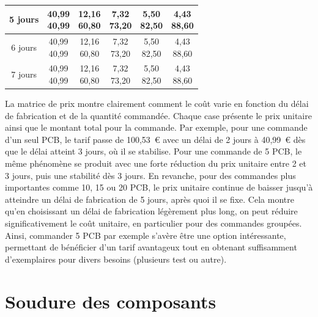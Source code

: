 \documentclass[12pt, a4paper, titlepage]{article}
\begin{document}
{\begin{table}[ht]
\begin{tabular}{|c|c|c|c|c|c|}
\hline
5 jours & 
\shortstack{40,99 \\ 40,99} & 
\shortstack{12,16 \\ 60,80} & 
\shortstack{7,32 \\ 73,20} & 
\shortstack{5,50 \\ 82,50} & 
\shortstack{4,43 \\ 88,60} \\
\hline
6 jours & 
\shortstack{40,99 \\ 40,99} & 
\shortstack{12,16 \\ 60,80} & 
\shortstack{7,32 \\ 73,20} & 
\shortstack{5,50 \\ 82,50} & 
\shortstack{4,43 \\ 88,60} \\
\hline
7 jours & 
\shortstack{40,99 \\ 40,99} & 
\shortstack{12,16 \\ 60,80} & 
\shortstack{7,32 \\ 73,20} & 
\shortstack{5,50 \\ 82,50} & 
\shortstack{4,43 \\ 88,60} \\
\hline
\end{tabular}
\end{table}
}

\bigskip

\noindent
La matrice de prix montre clairement comment le coût varie en fonction du délai de fabrication et de la quantité commandée. Chaque case présente le prix unitaire ainsi que le montant total pour la commande. Par exemple, pour une commande d’un seul PCB, le tarif passe de 100,53~€ avec un délai de 2 jours à 40,99~€ dès que le délai atteint 3 jours, où il se stabilise. Pour une commande de 5 PCB, le même phénomène se produit avec une forte réduction du prix unitaire entre 2 et 3 jours, puis une stabilité dès 3 jours. En revanche, pour des commandes plus importantes comme 10, 15 ou 20 PCB, le prix unitaire continue de baisser jusqu’à atteindre un délai de fabrication de 5 jours, après quoi il se fixe. Cela montre qu’en choisissant un délai de fabrication légèrement plus long, on peut réduire significativement le coût unitaire, en particulier pour des commandes groupées. Ainsi, commander 5 PCB par exemple s'avère être une option intéressante, permettant de bénéficier d'un tarif avantageux tout en obtenant suffisamment d'exemplaires pour divers besoins (plusieurs test ou autre).

\section{Soudure des composants}
\end{document}
